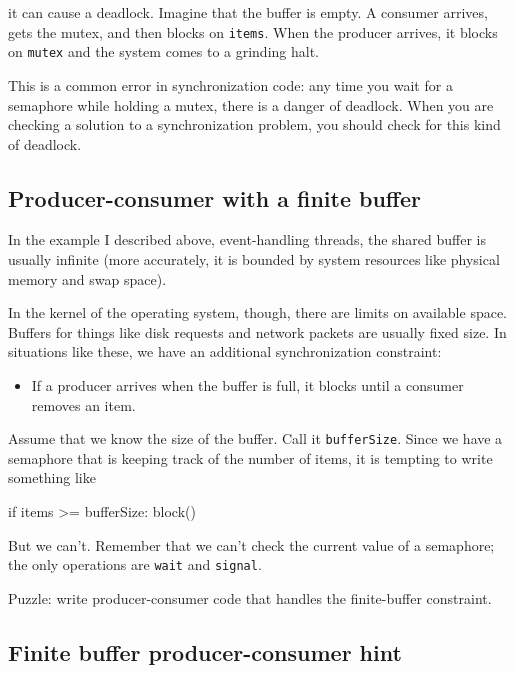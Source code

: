 \documentclass{book}
\begin{document}
it can cause a deadlock.  Imagine that the buffer is empty.
A consumer arrives, gets the mutex, and then blocks on
    {\tt items}.  When the producer arrives, it blocks on
    {\tt mutex} and the system comes to a grinding halt.

This is a common error in synchronization code: any time
you wait for a semaphore while holding a mutex, there is
a danger of deadlock.  When you are checking a solution to
a synchronization problem, you should check for this kind
of deadlock.


\subsection{Producer-consumer with a finite buffer}

In the example I described above, event-handling threads,
the shared buffer is usually infinite (more accurately, it is
bounded by system resources like physical memory and swap
space).

In the kernel of the operating system, though, there are
limits on available space.  Buffers for things like disk
requests and network packets are usually fixed size.  In
situations like these, we have an additional synchronization
constraint:

\begin{itemize}

    \item If a producer arrives when the buffer is full, it
          blocks until a consumer removes an item.

\end{itemize}

Assume that we know the size of the buffer.  Call it
    {\tt bufferSize}.  Since we have a semaphore that is keeping
track of the number of items, it is tempting to write something
like

\begin{unbreakable}[title={Broken finite buffer solution}]{}
if items >= bufferSize:
    block()
\end{unbreakable}

But we can't.  Remember that we can't check the current
value of a semaphore; the only operations are {\tt wait}
and {\tt signal}.

Puzzle: write producer-consumer code that handles the finite-buffer
constraint.


\subsection{Finite buffer producer-consumer hint}
\end{document}
